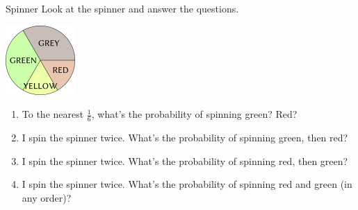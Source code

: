 \documentclass[12pt,letterpaper]{article}
\begin{document}
\begin{problem}{Spinner}
 Look at the spinner and answer the questions.
 \begin{center}
 \includegraphics[width=100px]{./spinner.png}
 \end{center}

 \begin{enumerate}[\hspace{.5cm}a.]
  \item To the nearest $\frac{1}{6}$, what's the probability of spinning green?
  Red?
  \item I spin the spinner twice. What's the probability of spinning green, then
  red?
  \item I spin the spinner twice. What's the probability of spinning red, then
  green?
  \item I spin the spinner twice. What's the probability of spinning red and
  green (in any order)?
 \end{enumerate}
\end{problem}
\end{document}
